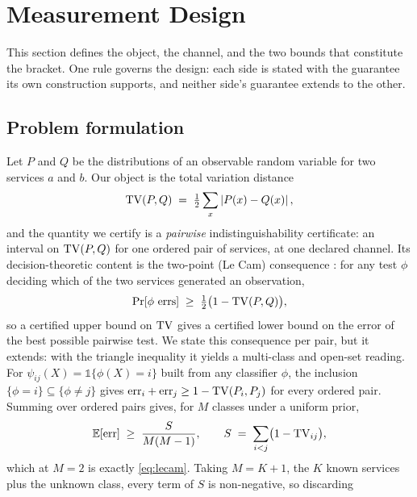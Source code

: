 \section{Measurement Design}
\label{sec:design}

This section defines the object, the channel, and the two bounds that constitute
the bracket. One rule governs the design: each side is stated with the guarantee
its own construction supports, and neither side's guarantee extends to the other.

\subsection{Problem formulation}
\label{sec:design/problem}

Let $P$ and $Q$ be the distributions of an observable random variable for two
services $a$ and $b$. Our object is the total variation distance
\begin{equation}
  \mathrm{TV}(P,Q) \;=\; \tfrac{1}{2}\sum_{x} \left\lvert P(x) - Q(x) \right\rvert,
  \label{eq:tv}
\end{equation}
and the quantity we certify is a \emph{pairwise} indistinguishability
certificate: an interval on $\mathrm{TV}(P,Q)$ for one ordered pair of services, at one
declared channel. Its decision-theoretic content is the two-point (Le Cam)
consequence \citep{lecam1973convergence, tsybakov2009introduction}: for any test
$\phi$ deciding which of the two services generated an observation,
\begin{equation}
  \Pr[\phi \text{ errs}] \;\ge\; \tfrac{1}{2}\bigl(1 - \mathrm{TV}(P,Q)\bigr),
  \label{eq:lecam}
\end{equation}
so a certified upper bound on $\mathrm{TV}$ gives a certified lower bound on the error
of the best possible pairwise test. We state this consequence per pair, but it
extends: with the triangle inequality it yields a multi-class and open-set
reading. For $\psi_{ij}(X) = \mathbb{1}\{\phi(X)=i\}$ built from any classifier
$\phi$, the inclusion $\{\phi=i\} \subseteq \{\phi \neq j\}$ gives
$\mathrm{err}_i + \mathrm{err}_j \ge 1 - \mathrm{TV}(P_i,P_j)$ for every ordered pair.
Summing over ordered pairs gives, for $M$ classes under a uniform prior,
\begin{equation}
  \mathbb{E}[\mathrm{err}] \;\ge\; \frac{S}{M(M-1)}, \qquad
  S \;=\; \sum_{i<j}\bigl(1 - \mathrm{TV}_{ij}\bigr),
  \label{eq:floor}
\end{equation}
which at $M=2$ is exactly \eqref{eq:lecam}. Taking $M = K+1$, the $K$ known
services plus the unknown class, every term of $S$ is non-negative, so discarding
